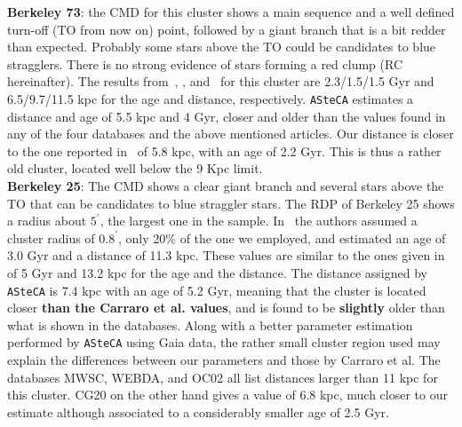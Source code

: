 \documentclass[referee]{aa}
\begin{document}
\begin{appendix}
  \noindent \textbf{Berkeley 73}: the CMD for this cluster shows a main sequence
  and a well defined turn-off (TO from now on) point, followed by a giant branch
  that is a bit redder than expected. Probably some stars above the TO could be
  candidates to blue stragglers. There is no strong evidence of stars forming a
  red clump (RC hereinafter).
  The results from~\cite{Ortolani_2005}, \cite{Carraro_2005},
  and~\cite{Carraro_2007_oldOC} for this cluster are 2.3/1.5/1.5 Gyr and
  6.5/9.7/11.5 kpc for the age and distance, respectively.
  \texttt{ASteCA} estimates a distance and age of 5.5 kpc and 4 Gyr,
  closer and older than the values found in any of the four databases and the
  above mentioned articles. Our distance is closer to the one reported
  in~\cite{Dias_2021} of 5.8 kpc, with an age of 2.2 Gyr. This is thus a
  rather old cluster, located well below the 9 Kpc limit.\\

  \noindent \textbf{Berkeley 25}: The CMD shows a clear giant branch and several stars
  above the TO that can be candidates to blue straggler stars. The RDP of
  Berkeley 25 shows a radius about $5^{\prime}$, the largest one in the sample.
  In~\cite{Carraro_2005} the authors assumed a cluster radius of $0.8^{\prime}$,
  only 20\% of the one we employed, and estimated an age of 3.0 Gyr and a
  distance of 11.3 kpc. These values are similar to the ones given
  in~\cite{Carraro_2007_oldOC} of 5 Gyr and 13.2 kpc for the age and the
  distance.
  The distance assigned by \texttt{ASteCA} is 7.4 kpc with an age of 5.2 Gyr,
  meaning that the cluster is located closer \textbf{than the Carraro et al.
  values}, and is found to be \textbf{slightly} older than what is shown in the
  databases.
  Along with a better parameter estimation performed by \texttt{ASteCA} using
  Gaia data, the rather small cluster region used may explain the differences
  between our parameters and those by Carraro et al. The databases MWSC,
  WEBDA, and OC02 all list distances larger than 11 kpc for this cluster. CG20
  on the other hand gives a value of 6.8 kpc, much closer to our estimate
  although associated to a considerably smaller age of 2.5 Gyr.\\


\end{appendix}
\end{document}
